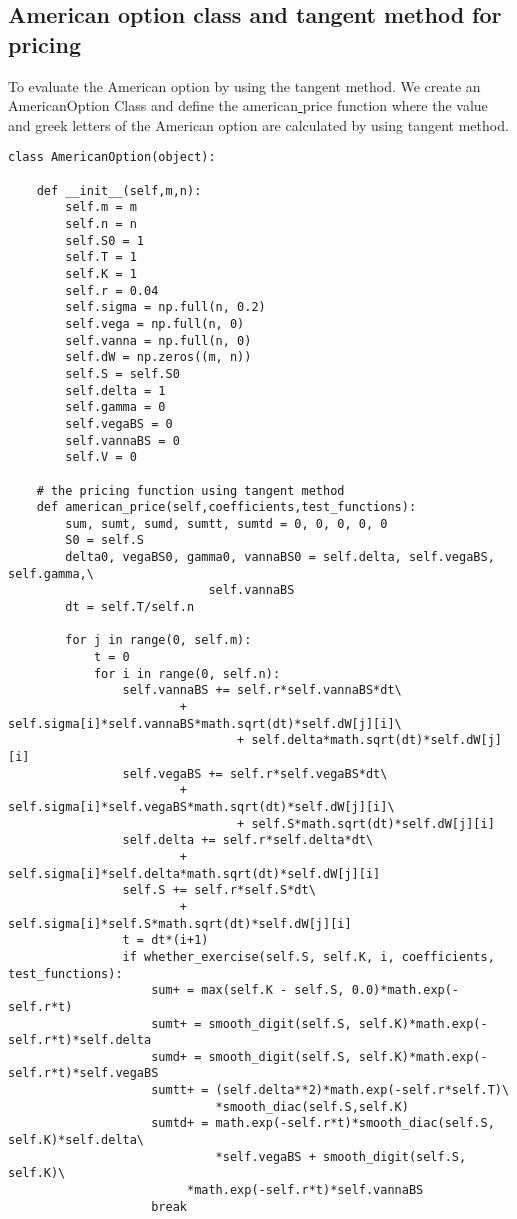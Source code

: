 \documentclass[11pt, oneside]{article}   	%
\begin{document}
\subsection{American option class and tangent method for pricing}
To evaluate the American option by using the tangent method. We create an AmericanOption Class and define the american\underline{ }price function where the value and greek letters of the American option are calculated by using tangent method.
\lstset{language=Python}
\lstset{frame=lines}
\lstset{basicstyle=\footnotesize}
\begin{lstlisting}
class AmericanOption(object):

    def __init__(self,m,n):
        self.m = m
        self.n = n
        self.S0 = 1
        self.T = 1
        self.K = 1
        self.r = 0.04
        self.sigma = np.full(n, 0.2)
        self.vega = np.full(n, 0)
        self.vanna = np.full(n, 0)
        self.dW = np.zeros((m, n))
        self.S = self.S0
        self.delta = 1
        self.gamma = 0
        self.vegaBS = 0
        self.vannaBS = 0
        self.V = 0

    # the pricing function using tangent method
    def american_price(self,coefficients,test_functions):
        sum, sumt, sumd, sumtt, sumtd = 0, 0, 0, 0, 0
        S0 = self.S
        delta0, vegaBS0, gamma0, vannaBS0 = self.delta, self.vegaBS, self.gamma,\
        			 	    self.vannaBS
        dt = self.T/self.n

        for j in range(0, self.m):
            t = 0
            for i in range(0, self.n):
                self.vannaBS += self.r*self.vannaBS*dt\
                		+ self.sigma[i]*self.vannaBS*math.sqrt(dt)*self.dW[j][i]\
                                + self.delta*math.sqrt(dt)*self.dW[j][i]
                self.vegaBS += self.r*self.vegaBS*dt\ 
                		+ self.sigma[i]*self.vegaBS*math.sqrt(dt)*self.dW[j][i]\
                                + self.S*math.sqrt(dt)*self.dW[j][i]
                self.delta += self.r*self.delta*dt\
                		+ self.sigma[i]*self.delta*math.sqrt(dt)*self.dW[j][i]
                self.S += self.r*self.S*dt\
                		+ self.sigma[i]*self.S*math.sqrt(dt)*self.dW[j][i]
                t = dt*(i+1)
                if whether_exercise(self.S, self.K, i, coefficients, test_functions):
                    sum+ = max(self.K - self.S, 0.0)*math.exp(- self.r*t)
                    sumt+ = smooth_digit(self.S, self.K)*math.exp(- self.r*t)*self.delta
                    sumd+ = smooth_digit(self.S, self.K)*math.exp(- self.r*t)*self.vegaBS
                    sumtt+ = (self.delta**2)*math.exp(-self.r*self.T)\
                    	     *smooth_diac(self.S,self.K)
                    sumtd+ = math.exp(-self.r*t)*smooth_diac(self.S, self.K)*self.delta\
                    	     *self.vegaBS + smooth_digit(self.S, self.K)\
	     	             *math.exp(-self.r*t)*self.vannaBS
                    break


\end{lstlisting}
\end{document}
